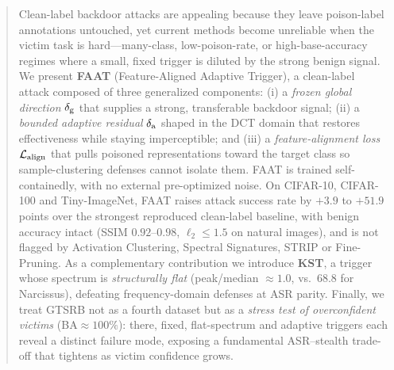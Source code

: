 \begin{abstract}
Clean-label backdoor attacks are appealing because they leave poison-label
annotations untouched, yet current methods become unreliable when the victim
task is hard---many-class, low-poison-rate, or high-base-accuracy regimes where
a small, fixed trigger is diluted by the strong benign signal.
We present \textbf{FAAT} (Feature-Aligned Adaptive Trigger), a clean-label
attack composed of three generalized components: (i) a \emph{frozen global
direction} $\dglobal$ that supplies a strong, transferable backdoor signal;
(ii) a \emph{bounded adaptive residual} $\dadapt$ shaped in the DCT domain that
restores effectiveness while staying imperceptible; and (iii) a
\emph{feature-alignment loss} $\Lalign$ that pulls poisoned representations
toward the target class so sample-clustering defenses cannot isolate them.
FAAT is trained self-containedly, with no external pre-optimized noise.
On CIFAR-10, CIFAR-100 and Tiny-ImageNet, FAAT raises attack success rate
by $+3.9$ to $+51.9$ points over the strongest reproduced clean-label baseline,
with benign accuracy intact (SSIM $0.92$--$0.98$, $\ell_2\!\le\!1.5$ on natural
images), and is not flagged by Activation Clustering, Spectral Signatures,
STRIP or Fine-Pruning. As a complementary contribution we introduce \textbf{KST},
a trigger whose spectrum is \emph{structurally flat} (peak/median $\approx\!1.0$,
vs.\ $68.8$ for Narcissus), defeating frequency-domain defenses at ASR parity.
Finally, we treat GTSRB not as a fourth dataset but as a \emph{stress test of
overconfident victims} (BA$\approx\!100\%$): there, fixed, flat-spectrum and
adaptive triggers each reveal a distinct failure mode, exposing a fundamental
ASR--stealth trade-off that tightens as victim confidence grows.
\end{abstract}
